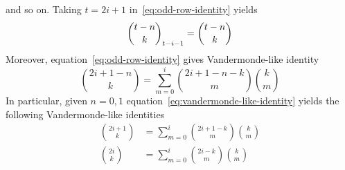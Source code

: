 and so on.
Taking $t=2i+1$ in~\eqref{eq:odd-row-identity} yields
\begin{align*}
    \binom{t-n}{k}_{t-i-1}= \binom{t-n}{k}
\end{align*}
Moreover, equation~\eqref{eq:odd-row-identity} gives Vandermonde-like identity
\begin{equation}
    \binom{2i+1-n}{k} = \sum_{m=0}^{i} \binom{2i+1-n-k}{m} \binom{k}{m}
    \label{eq:vandermonde-like-identity}
\end{equation}
In particular, given $n=0,1$ equation~\eqref{eq:vandermonde-like-identity}
yields the following Vandermonde-like identities
\begin{align*}
    \binom{2i+1}{k} &= \sum_{m=0}^{i} \binom{2i+1-k}{m} \binom{k}{m} \\
    \binom{2i}{k}   &= \sum_{m=0}^{i} \binom{2i-k}{m} \binom{k}{m}
\end{align*}
